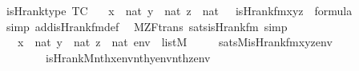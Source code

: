 \begin{isabellebody}
\isanewline
{}\isamarkupfalse%
\ is{\isacharunderscore}{\kern0pt}Hrank{\isacharunderscore}{\kern0pt}type\ {\isacharbrackleft}{\kern0pt}TC{\isacharbrackright}{\kern0pt}{\isacharcolon}{\kern0pt}\isanewline
\ \ {\isachardoublequoteopen}{\isasymlbrakk}\ x\ {\isasymin}\ nat{\isacharsemicolon}{\kern0pt}\ y\ {\isasymin}\ nat{\isacharsemicolon}{\kern0pt}\ z\ {\isasymin}\ nat\ {\isasymrbrakk}\ {\isasymLongrightarrow}\ is{\isacharunderscore}{\kern0pt}Hrank{\isacharunderscore}{\kern0pt}fm{\isacharparenleft}{\kern0pt}x{\isacharcomma}{\kern0pt}y{\isacharcomma}{\kern0pt}z{\isacharparenright}{\kern0pt}\ {\isasymin}\ formula{\isachardoublequoteclose}\isanewline
%
\isadelimproof
\ \ %
\endisadelimproof
%
\isatagproof
{}\isamarkupfalse%
\ {\isacharparenleft}{\kern0pt}simp\ add{\isacharcolon}{\kern0pt}is{\isacharunderscore}{\kern0pt}Hrank{\isacharunderscore}{\kern0pt}fm{\isacharunderscore}{\kern0pt}def{\isacharparenright}{\kern0pt}%
\endisatagproof
{\isafoldproof}%
%
\isadelimproof
\isanewline
%
\endisadelimproof
\isanewline
{}\isamarkupfalse%
\ {\isacharparenleft}{\kern0pt}\ M{\isacharunderscore}{\kern0pt}ZF{\isacharunderscore}{\kern0pt}trans{\isacharparenright}{\kern0pt}\ sats{\isacharunderscore}{\kern0pt}is{\isacharunderscore}{\kern0pt}Hrank{\isacharunderscore}{\kern0pt}fm\ {\isacharbrackleft}{\kern0pt}simp{\isacharbrackright}{\kern0pt}{\isacharcolon}{\kern0pt}\isanewline
\ \ {\isachardoublequoteopen}{\isasymlbrakk}\ x\ {\isasymin}\ nat{\isacharsemicolon}{\kern0pt}\ y\ {\isasymin}\ nat{\isacharsemicolon}{\kern0pt}\ z\ {\isasymin}\ nat{\isacharsemicolon}{\kern0pt}\ env\ {\isasymin}\ list{\isacharparenleft}{\kern0pt}M{\isacharparenright}{\kern0pt}{\isasymrbrakk}\isanewline
\ \ \ \ {\isasymLongrightarrow}\ sats{\isacharparenleft}{\kern0pt}M{\isacharcomma}{\kern0pt}is{\isacharunderscore}{\kern0pt}Hrank{\isacharunderscore}{\kern0pt}fm{\isacharparenleft}{\kern0pt}x{\isacharcomma}{\kern0pt}y{\isacharcomma}{\kern0pt}z{\isacharparenright}{\kern0pt}{\isacharcomma}{\kern0pt}env{\isacharparenright}{\kern0pt}\ {\isasymlongleftrightarrow}\isanewline
\ \ \ \ \ \ \ \ is{\isacharunderscore}{\kern0pt}Hrank{\isacharparenleft}{\kern0pt}{\isacharhash}{\kern0pt}{\isacharhash}{\kern0pt}M{\isacharcomma}{\kern0pt}nth{\isacharparenleft}{\kern0pt}x{\isacharcomma}{\kern0pt}env{\isacharparenright}{\kern0pt}{\isacharcomma}{\kern0pt}nth{\isacharparenleft}{\kern0pt}y{\isacharcomma}{\kern0pt}env{\isacharparenright}{\kern0pt}{\isacharcomma}{\kern0pt}nth{\isacharparenleft}{\kern0pt}z{\isacharcomma}{\kern0pt}env{\isacharparenright}{\kern0pt}{\isacharparenright}{\kern0pt}{\isachardoublequoteclose}\isanewline

\end{isabellebody}
